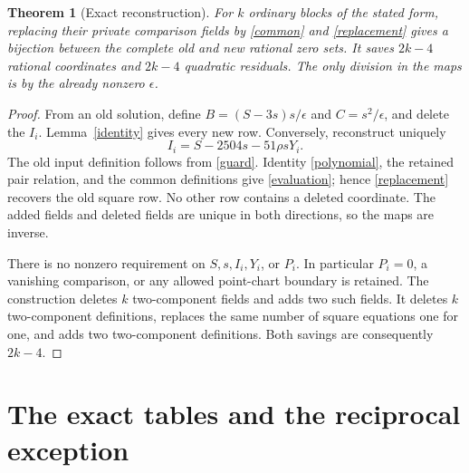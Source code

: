 \documentclass[11pt]{article}
\newtheorem{theorem}{Theorem}
\begin{document}
\begin{theorem}[Exact reconstruction]\label{bijection}
For $k$ ordinary blocks of the stated form, replacing their private
comparison fields by \eqref{common} and \eqref{replacement} gives
a bijection between the complete old and new rational zero sets.
It saves $2k-4$ rational coordinates and $2k-4$ quadratic residuals.
The only division in the maps is by the already nonzero $\epsilon$.
\end{theorem}
\begin{proof}
From an old solution, define $B=(S-3s)s/\epsilon$ and
$C=s^2/\epsilon$, and delete the $I_i$. Lemma~\ref{identity}
gives every new row. Conversely, reconstruct uniquely
\begin{equation}\label{recover}
                   I_i=S-2504s-51\rho sY_i.
\end{equation}
The old input definition follows from \eqref{guard}. Identity
\eqref{polynomial}, the retained pair relation, and the common
definitions give \eqref{evaluation}; hence \eqref{replacement}
recovers the old square row. No other row contains a deleted
coordinate. The added fields and deleted fields are unique in
both directions, so the maps are inverse.

There is no nonzero requirement on $S,s,I_i,Y_i$, or $P_i$.
In particular $P_i=0$, a vanishing comparison, or any allowed
point-chart boundary is retained. The construction deletes $k$
two-component fields and adds two such fields. It deletes $k$
two-component definitions, replaces the same number of square
equations one for one, and adds two two-component definitions.
Both savings are consequently $2k-4$.
\end{proof}

\section{The exact tables and the reciprocal exception}
\end{document}
